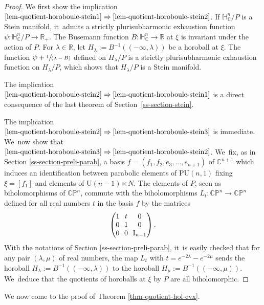 \documentclass[11pt]{article}
\newcommand{\spfrac}[2]{\sfrac{#1}{(#2)}}
\theoremstyle{definition}
\newcommand{\C}{\mathbb{C}}
\newcommand{\R}{\mathbb{R}}
\newcommand{\HNC}{\mathbb{H}^{n}_{\C}}
\newcommand{\PU}{\mathrm{PU}}
\newcommand{\PNC}{\C \mathbb{P}^{n}}
\def\C{\mathbb{C}}
\newcommand{\HNC}{\mathbb{H}^{n}_{\C}}
\newcommand{\PU}{\mathrm{PU}}
\begin{document}
\begin{proof}
We first show the implication $\eqref{lem-quotient-horoboule-stein1}\Rightarrow\eqref{lem-quotient-horoboule-stein2}$. If $\HNC/P$ is a Stein manifold, it~admits a strictly plurisubharmonic exhaustion function $\psi:\HNC/P\to \R_+$. The Busemann function $B:\HNC\to \R$ at $\xi$ is invariant under the action of $P$. For $\lambda\in\mathbb{R}$, let $H_{\lambda}:= B^{-1}((-\infty,\lambda))$ be a horoball at $\xi$. The function $\psi + \spfrac{1}{\lambda - B}$ defined on $H_{\lambda}/P$ is a strictly plurisubharmonic exhaustion function on $H_{\lambda}/P$, which shows that $H_{\lambda}/P$ is a Stein manifold.

The implication $\eqref{lem-quotient-horoboule-stein2}\Rightarrow\eqref{lem-quotient-horoboule-stein1}$ is a direct consequence of the last theorem of Section~\ref{ss-section-stein}.

The implication $\eqref{lem-quotient-horoboule-stein2}\Rightarrow\eqref{lem-quotient-horoboule-stein3}$ is immediate. We~now show that $\eqref{lem-quotient-horoboule-stein3}\Rightarrow\eqref{lem-quotient-horoboule-stein2}$. We~fix, as in Section \ref{ss-section-preli-parab}, a basis $f=(f_1,f_2,e_3,\dots,e_{n+1})$ of $\C^{n+1}$ which induces an identification between parabolic elements of $\PU(n,1)$ fixing $\xi=[f_1]$ and elements of $\mathrm{U}(n-1)\ltimes N$. The elements of $P$, seen as biholomorphisms of $\PNC$, commute with the biholomorphisms $L_t:\PNC\to \PNC$ defined for all real numbers $t$ in the basis $f$ by the matrices
\begin{equation*}
\arraycolsep3.5pt
\begin{pmatrix}
1 &t &0\\
0 &1 &0\\
0 &0 &\mathrm{I}_{n-1}
\end{pmatrix}.
\end{equation*}
With the notations of Section \ref{ss-section-preli-parab}, it~is easily checked that for any pair $(\lambda,\mu)$ of real numbers, the map $L_t$ with $t=e^{-2\lambda}-e^{-2\mu}$ sends the horoball $H_{\lambda}:=B^{-1}((-\infty,\lambda))$ to the horoball $H_{\mu}:=B^{-1}((-\infty,\mu))$. We~deduce that the quotients of horoballs at $\xi$ by $P$ are all biholomorphic.
\end{proof}

We now come to the proof of Theorem \ref{thm-quotient-hol-cvx}.
\end{document}
